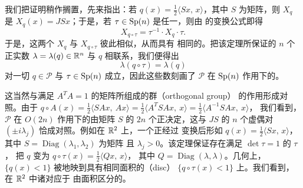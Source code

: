 我们把证明稍作搁置，先来指出：若 $q(x)=\frac{1}{2}\langle Sx,\,x\rangle$，其中 $S$%
为\trPositiveDefinite\trSymmetric{}矩阵，则 $X_q$ 是\trLinear\trVectorField{}%
$X_q(x)=JSx$；于是，若 $\tau\in\operatorname{Sp}(n)$ 是任一\trSymplecticMatrix，则由%
\trHamiltonianVectorField{}的变换公式即得
\[
X_{q\circ\tau}=\tau^{-1}\cdot X_q\cdot\tau.
\]
于是，这两个\trLinear\trVectorField{} $X_q$ 与 $X_{q\circ\tau}$ 彼此相似，从而具有%
相同的\trEigenvalue。把该定理所保证的 $n$ 个正实数 $\lambda=\lambda(q)\in\mathbb{R}^{n}$%
与 $q$ 相联系，我们便得出
\[
\lambda(q\circ\tau)=\lambda(q)
\]
对一切 $q\in\mathcal{P}$ 与 $\tau\in\operatorname{Sp}(n)$ 成立，因此这些数刻画了 $\mathcal{P}$%
在 $\operatorname{Sp}(n)$ 作用下的\trOrbit。

这当然与满足 $A^{T}A=1$ 的矩阵所组成的\trOrthogonal{}群（orthogonal group）%
的作用形成对照。由于 $q\circ A(x)=\frac{1}{2}\langle SAx,\ Ax\rangle=%
\frac{1}{2}\langle A^{T}SAx,\ x\rangle=\frac{1}{2}\langle A^{-1}SAx,\ x\rangle$，%
我们看到，$\mathcal{P}$ 在 $O(2n)$ 作用下的\trOrbit{}由\trSymmetric{}矩阵 $S$%
的 $2n$ 个正\trEigenvalue{}决定，这与 $JS$ 的 $n$ 个虚\trEigenvalue{}偶对%
$(\pm i\lambda_j)$ 恰成对照。例如在 $\mathbb{R}^{2}$ 上，一个正\trQuadraticForm{}经过%
\trOrthogonal{}变换后形如 $q(x)=\frac{1}{2}\langle Sx,\,x\rangle$，其中%
$S=\operatorname{Diag}(\lambda_1,\lambda_2)$ 为\trDiagonal{}矩阵%
且 $\lambda_j>0$。该定理保证存在满足 $\det\tau=1$ 的\trLinear\trMapping{} $\tau$，%
把 $q$ 变为\trSymplectic\trNormalForm{} $q\circ\tau(x)=\frac{1}{2}\langle Qx,\,x\rangle$，%
其中 $Q=\operatorname{Diag}(\lambda,\lambda)$。几何上，\trEllipsoid{}%
$\{q(x)<1\}$ 被\trSymplectic{}地映到具有相同面积的\textbf{\trDisc}（disc）%
$\{q\circ\tau(x)<1\}$ 上。我们看到，在 $\mathbb{R}^{2}$ 中诸\trNormalForm{}对应于%
由面积区分的\trDisc。

